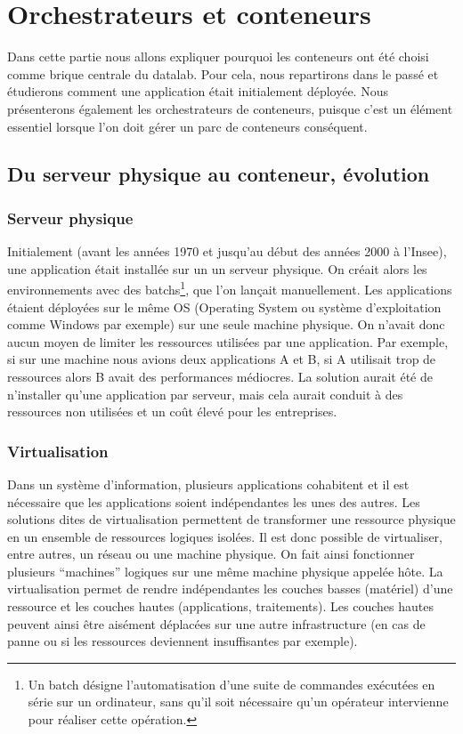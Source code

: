 \documentclass[11pt,fleqn]{book} %
\begin{document}
\chapter{Orchestrateurs et conteneurs}
\vspace{-2cm}

Dans cette partie nous allons expliquer pourquoi les conteneurs ont été choisi comme brique centrale du datalab. Pour cela, nous repartirons dans le passé et étudierons comment une application était initialement déployée. Nous présenterons également les orchestrateurs de conteneurs, puisque c'est un élément essentiel lorsque l'on doit gérer un parc de conteneurs conséquent.

\section{Du serveur physique au conteneur, évolution}
\subsection{Serveur physique}
Initialement (avant les années 1970 et jusqu'au début des années 2000 à l'Insee), une application était installée sur un un serveur physique. On créait alors les environnements avec des batchs\footnote{Un batch désigne l'automatisation d'une suite de commandes exécutées en série sur un ordinateur, sans qu'il soit nécessaire qu'un opérateur intervienne pour réaliser cette opération.}, que l'on lançait manuellement. Les applications étaient déployées sur le même OS (Operating System ou système d'exploitation comme Windows par exemple) sur une seule machine physique. On n'avait donc aucun moyen de limiter les ressources utilisées par une application. Par exemple, si sur une machine nous avions deux applications A et B, si A utilisait trop de ressources alors B avait des performances médiocres. La solution aurait été de n'installer qu'une application par serveur, mais cela aurait conduit à des ressources non utilisées et un coût élevé pour les entreprises. \newline

\subsection{Virtualisation}
Dans un système d'information, plusieurs applications cohabitent et il est nécessaire que les applications soient indépendantes les unes des autres. Les solutions dites de virtualisation permettent de transformer une ressource physique en un ensemble de ressources logiques isolées. Il est donc possible de virtualiser, entre autres, un réseau ou une machine physique. On fait ainsi fonctionner plusieurs “machines” logiques sur une même machine physique appelée hôte. La virtualisation permet de rendre indépendantes les couches basses (matériel) d’une ressource et les couches hautes (applications, traitements). Les couches hautes peuvent ainsi être aisément déplacées sur une autre infrastructure (en cas de panne ou si les ressources deviennent insuffisantes par exemple).
\end{document}
